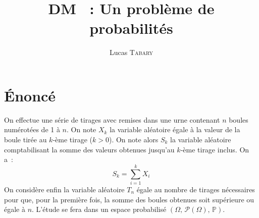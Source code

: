 \documentclass{article}
\title{\textbf{DM \No 15~: Un problème de probabilités}}
\author{Lucas \textsc{Tabary}}
\date{}
\newcommand{\prob}{\mathbb{P}}
\begin{document}
  \maketitle
  \hrulefill

  \vspace{1.2cm}
  \hrulefill

  \section*{Énoncé}
  On effectue une série de tirages avec remises dans une urne contenant $n$ boules numérotées de 1 à $n$. On note $X_k$ la variable aléatoire égale à la valeur de la boule tirée au $k$-ème tirage ($k > 0$). On note alors $S_k$ la variable aléatoire comptabilisant la somme des valeurs obtenues jusqu'au $k$-ème tirage inclus. On a~:
  \[
    S_k = \sum_{i=1}^k X_i
  \]
  On considère enfin la variable aléatoire $T_n$ égale au nombre de tirages nécessaires pour que, pour la première fois, la somme des boules obtenues soit supérieure ou égale à $n$. L'étude se fera dans un espace probabilisé $(\Omega,\, \mathcal{P}(\Omega),\, \prob)$.
\end{document}
